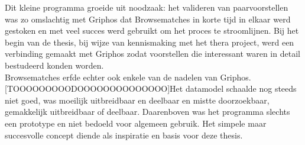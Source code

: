 Dit kleine programma groeide uit noodzaak: het valideren van paarvoorstellen was zo omslachtig met Griphos dat Browsematches in korte tijd in elkaar werd gestoken en met veel succes werd gebruikt om het proces te stroomlijnen. Bij het begin van de thesis, bij wijze van kennismaking met het thera project, werd een verbinding gemaakt met Griphos zodat voorstellen die interessant waren in detail bestudeerd konden worden.\\

Browsematches erfde echter ook enkele van de nadelen van Griphos. [TOOOOOOOOODOOOOOOOOOOOOOO]Het datamodel schaalde nog steeds niet goed, was moeilijk uitbreidbaar en deelbaar en mistte doorzoekbaar, gemakkelijk uitbreidbaar of deelbaar. Daarenboven was het programma slechts een prototype en niet bedoeld voor algemeen gebruik. Het simpele maar succesvolle concept diende als inspiratie en basis voor deze thesis. 

